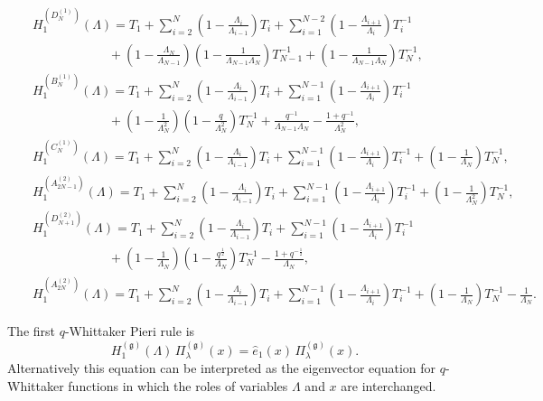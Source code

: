 \documentclass[12pt]{amsart}
\newcommand{\g}{{\mathfrak{g}}}
\newcommand{\lL}{{\Lambda}}
\numberwithin{equation}{section}
\begin{document}
\begin{eqnarray*}
%
&&H_1^{(D_N^{(1)})}(\lL)=T_1+\sum_{i=2}^N \left(1-\frac{\lL_i}{\lL_{i-1}}\right)T_i+\sum_{i=1}^{N-2}
 \left(1-\frac{\lL_{i+1}}{\lL_{i}}\right)T_i^{-1}\nonumber \\
&&\qquad\qquad\qquad +\left(1-\frac{\lL_N}{\lL_{N-1}}\right)\left(1-\frac{1}{\lL_{N-1}\lL_N}\right)T_{N-1}^{-1}+
 \left(1-\frac{1}{\lL_{N-1}\lL_N}\right)T_{N}^{-1},\nonumber\\
&&H_1^{(B_N^{(1)})}(\lL)=T_1+\sum_{i=2}^N \left(1-\frac{\lL_i}{\lL_{i-1}}\right)T_i+\sum_{i=1}^{N-1}
 \left(1-\frac{\lL_{i+1}}{\lL_{i}}\right)T_i^{-1}\nonumber \\
&&\qquad\qquad\qquad +\left(1-\frac{1}{\lL_N^2}\right)\left(1-\frac{q}{\lL_N^2}\right)T_N^{-1}
 +\frac{q^{-1}}{\lL_{N-1}\lL_N}-\frac{1+q^{-1}}{\lL_N^2},\nonumber\\
&&H_1^{(C_N^{(1)})}(\lL)=T_1+\sum_{i=2}^N \left(1-\frac{\lL_i}{\lL_{i-1}}\right)T_i+\sum_{i=1}^{N-1}
 \left(1-\frac{\lL_{i+1}}{\lL_{i}}\right)T_i^{-1}
%
%
+\left(1-\frac{1}{\lL_{N}}\right)T_N^{-1}, \nonumber \\
&&H_1^{(A_{2N-1}^{(2)})}(\lL)=T_1+\sum_{i=2}^N \left(1-\frac{\lL_i}{\lL_{i-1}}\right)T_i+\sum_{i=1}^{N-1}
 \left(1-\frac{\lL_{i+1}}{\lL_{i}}\right)T_i^{-1}
%
%
+\left(1-\frac{1}{\lL_{N}^2}\right)T_N^{-1}, \nonumber\\
&&H_1^{(D_{N+1}^{(2)})}(\lL)= T_1+\sum_{i=2}^N \left(1-\frac{\lL_i}{\lL_{i-1}}\right)T_i+\sum_{i=1}^{N-1}
\left(1-\frac{\lL_{i+1}}{\lL_{i}}\right)T_i^{-1}\nonumber\\
&&\qquad\qquad\qquad +\left(1-\frac{1}{\lL_N}\right)\left(1-\frac{q^{\frac{1}{2}}}{\lL_N}\right)T_N^{-1}
 -\frac{1+q^{-\frac{1}{2}}}{\lL_N},\nonumber\\
 &&H_1^{(A_{2N}^{(2)})}(\lL)=T_1+\sum_{i=2}^N \left(1-\frac{\lL_i}{\lL_{i-1}}\right)T_i+\sum_{i=1}^{N-1}
 \left(1-\frac{\lL_{i+1}}{\lL_{i}}\right)T_i^{-1}+\left(1-\frac{1}{\lL_{N}}\right)T_N^{-1}-\frac{1}{\lL_{N}}.
%
%
%
\end{eqnarray*}


The first $q$-Whittaker Pieri rule is
\begin{equation}\label{pieriwhit}H_1^{(\g)}(\lL)\, \Pi_\lambda^{(\g)}(x)= {\hat e}_1(x)\, \Pi_\lambda^{(\g)}(x).
\end{equation}
Alternatively this equation can be interpreted as the eigenvector equation for $q$-Whittaker functions
in which the roles of variables $\lL$ and $x$ are interchanged. 
\end{document}
